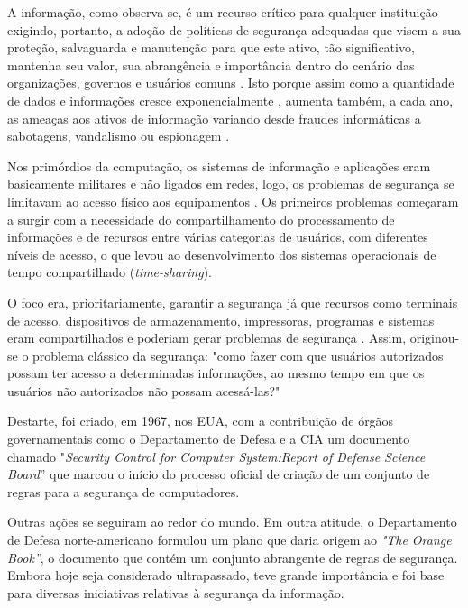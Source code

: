 A informação, como observa-se, é um recurso crítico para qualquer instituição exigindo, portanto, a adoção de políticas de segurança adequadas que visem a sua proteção, salvaguarda e manutenção para que este ativo, tão significativo, mantenha seu valor, sua abrangência e importância dentro do cenário das organizações, governos e usuários comuns \cite{marciano_segurancda_nodate}. Isto porque assim como a quantidade de dados e informações cresce exponencialmente \cite{alecrim2019}, aumenta também, a cada ano, as ameaças aos ativos de informação variando desde fraudes informáticas a sabotagens, vandalismo ou espionagem \cite{casaca_porque_2013}.

Nos primórdios da computação, os sistemas de informação e aplicações eram basicamente militares e não ligados em redes, logo, os problemas de segurança se limitavam ao acesso físico aos equipamentos \cite{benz_universidade_nodate}. Os primeiros problemas começaram a surgir com a necessidade do compartilhamento do processamento de informações e de recursos entre várias categorias de usuários, com diferentes níveis de acesso, o que levou ao desenvolvimento dos sistemas operacionais de tempo compartilhado (\textit{time-sharing}). 

O foco era, prioritariamente, garantir a segurança já que recursos como terminais de acesso, dispositivos de armazenamento, impressoras, programas e sistemas eram compartilhados e poderiam gerar problemas de segurança \cite{benz_universidade_nodate}. Assim, originou-se o problema clássico da segurança: "como fazer com que usuários autorizados possam ter acesso a determinadas informações, ao mesmo tempo em que os usuários não autorizados não possam acessá-las?" \cite{nist_guttman_introduction_1995}

Destarte, foi criado, em 1967, nos EUA, com a contribuição de órgãos governamentais como o Departamento de Defesa e a CIA um documento chamado "\textit{Security Control for Computer System:Report of Defense Science Board}'' que marcou o início do processo oficial de criação de um conjunto de regras para a segurança de computadores. 

Outras ações se seguiram ao redor do mundo. Em outra atitude, o Departamento de Defesa norte-americano formulou um plano que daria origem ao \textit{"The Orange Book''}, o documento que contém um conjunto abrangente de regras de segurança. Embora hoje seja considerado ultrapassado, teve grande importância e foi base para diversas iniciativas relativas à segurança da informação. \cite{goncalves_nbr_2013}

